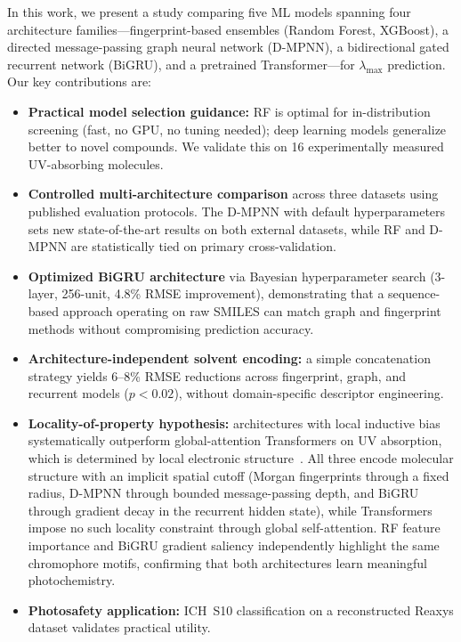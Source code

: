 \documentclass[11pt,a4paper]{article}
\begin{document}
In this work, we present a study comparing five ML models spanning four architecture families---fingerprint-based ensembles (Random Forest, XGBoost), a directed message-passing graph neural network (D-MPNN), a bidirectional gated recurrent network (BiGRU), and a pretrained Transformer---for $\lambda_{\max}$ prediction.
Our key contributions are:
\begin{itemize}
    \item \textbf{Practical model selection guidance:} RF is optimal for in-distribution screening (fast, no GPU, no tuning needed); deep learning models generalize better to novel compounds. We validate this on 16 experimentally measured UV-absorbing molecules.
    \item \textbf{Controlled multi-architecture comparison} across three datasets using published evaluation protocols. The D-MPNN with default hyperparameters sets new state-of-the-art results on both external datasets, while RF and D-MPNN are statistically tied on primary cross-validation.
    \item \textbf{Optimized BiGRU architecture} via Bayesian hyperparameter search (3-layer, 256-unit, 4.8\% RMSE improvement), demonstrating that a sequence-based approach operating on raw SMILES can match graph and fingerprint methods without compromising prediction accuracy.
    \item \textbf{Architecture-independent solvent encoding:} a simple concatenation strategy yields 6--8\% RMSE reductions across fingerprint, graph, and recurrent models ($p < 0.02$), without domain-specific descriptor engineering.
    \item \textbf{Locality-of-property hypothesis:} architectures with local inductive bias systematically outperform global-attention Transformers on UV absorption, which is determined by local electronic structure~\cite{chenMolecularLanguage2023}. All three encode molecular structure with an implicit spatial cutoff (Morgan fingerprints through a fixed radius, D-MPNN through bounded message-passing depth, and BiGRU through gradient decay in the recurrent hidden state), while Transformers impose no such locality constraint through global self-attention. RF feature importance and BiGRU gradient saliency independently highlight the same chromophore motifs, confirming that both architectures learn meaningful photochemistry.
    \item \textbf{Photosafety application:} ICH~S10 classification on a reconstructed Reaxys dataset validates practical utility.
\end{itemize}
\end{document}
